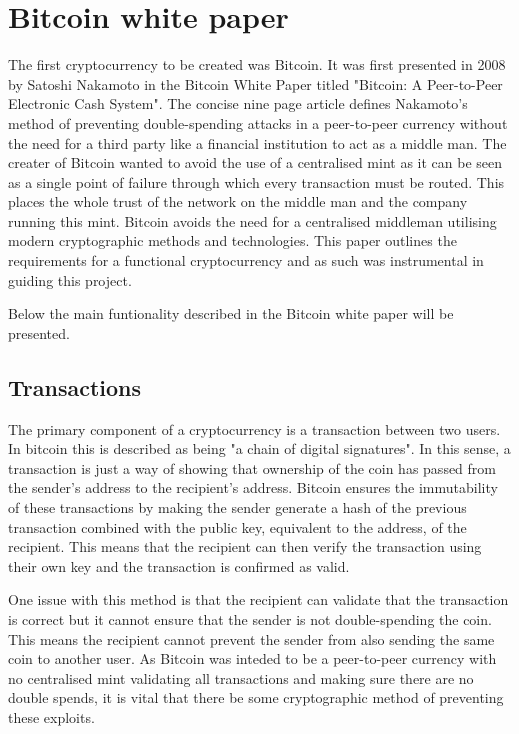 \documentclass{l4proj}
\begin{document}
\section{Bitcoin white paper}
The first cryptocurrency to be created was Bitcoin. It was first presented in 2008 by Satoshi Nakamoto in the Bitcoin White Paper
titled "Bitcoin: A Peer-to-Peer Electronic Cash System". The concise nine page article defines Nakamoto's method of preventing
double-spending attacks in a peer-to-peer currency without the need for a third party like a financial institution to 
act as a middle man. The creater of Bitcoin wanted to avoid the use of a centralised mint as it can be seen as a single 
point of failure through which every transaction must be routed. This places the whole trust of the network on the middle 
man and the company running this mint.  Bitcoin avoids the need for a centralised middleman utilising modern cryptographic 
methods and technologies. This paper outlines the requirements for a functional cryptocurrency and as such was instrumental 
in guiding this project.

Below the main funtionality described in the Bitcoin white paper will be presented.


\subsection{Transactions}
The primary component of a cryptocurrency is a transaction between two users. In bitcoin this is described as being "a
chain of digital signatures". In this sense, a transaction is just a way of showing that ownership of the coin has
passed from the sender's address to the recipient's address. Bitcoin ensures the immutability of these transactions
by making the sender generate a hash of the previous transaction combined with the public key, equivalent to the address,
of the recipient. This means that the recipient can then verify the transaction using their own key and the transaction
is confirmed as valid.

One issue with this method is that the recipient can validate that the transaction is correct but it cannot ensure
that the sender is not double-spending the coin. This means the recipient cannot prevent the sender from also sending the 
same coin to another user. As Bitcoin was inteded to be a peer-to-peer currency with no centralised mint validating
all transactions and making sure there are no double spends, it is vital that there be some cryptographic method of
preventing these exploits.
\end{document}
